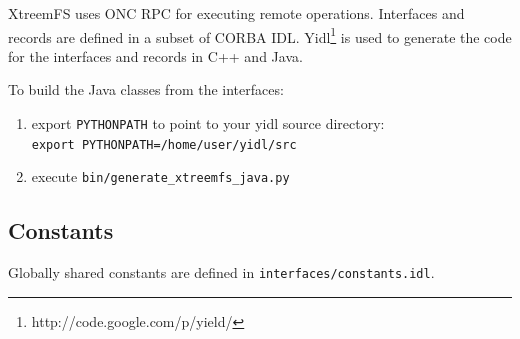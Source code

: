 





XtreemFS uses ONC RPC\cite{RFC1831} for executing remote operations. Interfaces and records are defined in a subset of CORBA IDL. Yidl\footnote{http://code.google.com/p/yield/} is used to generate the code for the interfaces and records in C++ and Java.

To build the Java classes from the interfaces:
\begin{enumerate}
 \item export \texttt{PYTHONPATH} to point to your yidl source directory:\\
       \texttt{export PYTHONPATH=/home/user/yidl/src}
 \item execute \texttt{bin/generate\_xtreemfs\_java.py}
\end{enumerate}


\makeatletter
\renewcommand\paragraph{\@startsection{paragraph}{4}{\z@}%
  {-3.25ex\@plus -1ex \@minus -.2ex}%
  {0.1ex \@plus .0ex}%
  {\normalfont\normalsize\bfseries}}
\makeatother

\subsection{Constants}
\label{sec:xtreemfs_proto_const}

Globally shared constants are defined in \texttt{in\-ter\-faces/const\-ants.idl}.

